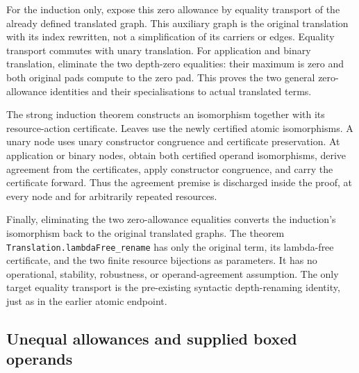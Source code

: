 For the induction only, expose this zero allowance by equality transport
of the already defined translated graph. This auxiliary graph is the original
translation with its index rewritten, not a simplification of its carriers or
edges. Equality transport commutes with unary translation. For application and
binary translation, eliminate the two depth-zero equalities: their maximum is
zero and both original pads compute to the zero pad. This proves the two general
zero-allowance identities and their specialisations to actual translated terms.


The strong induction theorem constructs an isomorphism together with its
resource-action certificate. Leaves use the newly certified atomic isomorphisms.
A unary node uses unary constructor congruence and certificate preservation.
At application or binary nodes, obtain both certified operand isomorphisms,
derive agreement from the certificates, apply constructor congruence, and carry
the certificate forward. Thus the agreement premise is discharged inside the
proof, at every node and for arbitrarily repeated resources.

Finally, eliminating the two zero-allowance equalities converts the induction's
isomorphism back to the original translated graphs. The theorem
\texttt{Translation.lambdaFree\_rename} has only the original term, its
lambda-free certificate, and the two finite resource bijections as parameters.
It has no operational, stability, robustness, or operand-agreement assumption.
The only target equality transport is the pre-existing syntactic depth-renaming
identity, just as in the earlier atomic endpoint.


\subsection{Unequal allowances and supplied boxed operands}

